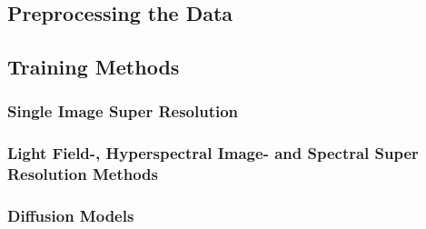\subsection{Preprocessing the Data}

\subsection{Training Methods}

\subsubsection{Single Image Super Resolution}

\subsubsection{Light Field-, Hyperspectral Image- and Spectral Super Resolution Methods}

\subsubsection{Diffusion Models}